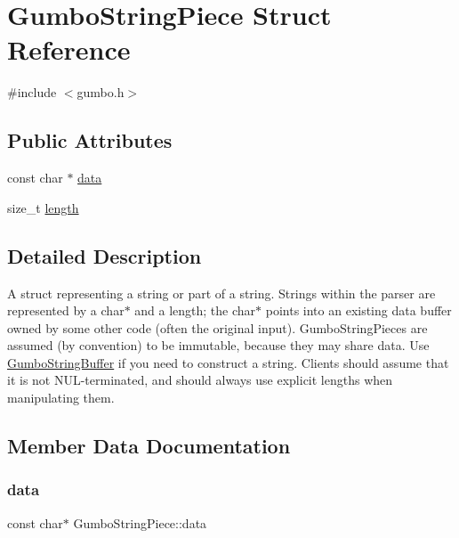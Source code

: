 \hypertarget{struct_gumbo_string_piece}{}\section{Gumbo\+String\+Piece Struct Reference}
\label{struct_gumbo_string_piece}


{\ttfamily \#include $<$gumbo.\+h$>$}

\subsection*{Public Attributes}
\begin{DoxyCompactItemize}
\item 
const char $\ast$ \mbox{\hyperlink{struct_gumbo_string_piece_a6aaa0aeddd6d0a05b60052198313a62d}{data}}
\item 
size\+\_\+t \mbox{\hyperlink{struct_gumbo_string_piece_a88116bfa980b950bd5615731f61ed09e}{length}}
\end{DoxyCompactItemize}


\subsection{Detailed Description}
A struct representing a string or part of a string. Strings within the parser are represented by a char$\ast$ and a length; the char$\ast$ points into an existing data buffer owned by some other code (often the original input). Gumbo\+String\+Pieces are assumed (by convention) to be immutable, because they may share data. Use \mbox{\hyperlink{struct_gumbo_string_buffer}{Gumbo\+String\+Buffer}} if you need to construct a string. Clients should assume that it is not N\+U\+L-\/terminated, and should always use explicit lengths when manipulating them. 

\subsection{Member Data Documentation}
\mbox{\label{struct_gumbo_string_piece_a6aaa0aeddd6d0a05b60052198313a62d}} 
\subsubsection{\texorpdfstring{data}{data}}
{\footnotesize\ttfamily const char$\ast$ Gumbo\+String\+Piece\+::data}


